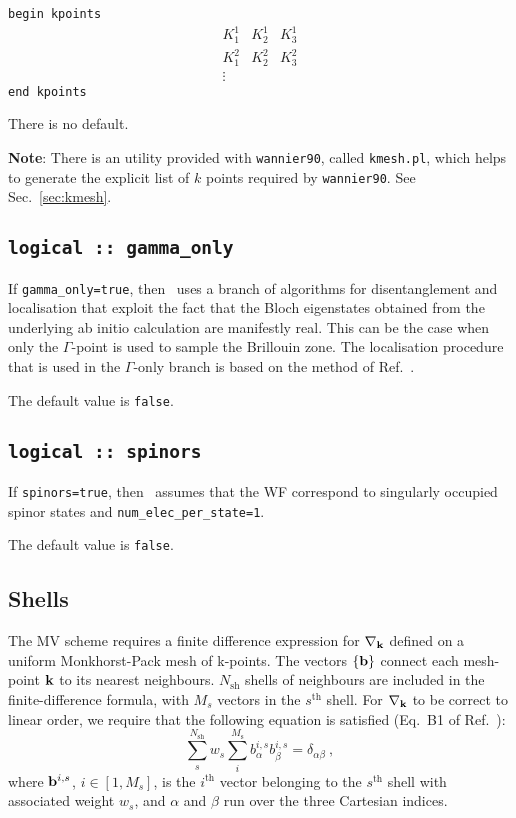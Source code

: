 \noindent \verb#begin kpoints# \\
$$
\begin{array}{ccc}
 K^{1}_{1} & K^{1}_{2} & K^{1}_{3} \\
 K^{2}_{1} & K^{2}_{2} & K^{2}_{3} \\
\vdots
\end{array}
$$
\verb#end kpoints#


There is no default.

{\bfseries Note}: There is an utility provided with {\tt wannier90},
called {\tt kmesh.pl}, which helps to generate the explicit list of
$k$ points required by {\tt wannier90}. See Sec.~\ref{sec:kmesh}.

\subsection[gamma\_only]{{\tt logical :: gamma\_only}}

If {\tt gamma\_only=true}, then \wannier\ uses a branch of algorithms
for disentanglement and localisation that exploit the fact that the 
Bloch eigenstates obtained from the underlying ab initio calculation
are manifestly real. This can be the case when only the $\Gamma$-point
is used to sample the Brillouin zone. The localisation procedure
that is used in the $\Gamma$-only branch is based on the method of
Ref.~\cite{gygi-cpc03}.

The default value is {\tt false}.


\subsection[spinors]{{\tt logical :: spinors}}

If {\tt spinors=true}, then \wannier\ 
assumes that the WF correspond to singularly occupied spinor states and {\tt num\_elec\_per\_state=1}.

The default value is {\tt false}.

\subsection{Shells}

The MV scheme requires a finite difference expression
for $\nabla_{\bf k}$ defined on a uniform Monkhorst-Pack mesh of
k-points. The vectors $\{{\bf b}\}$ connect each mesh-point ${\bf k}$
  to its nearest neighbours. $N_{\mathrm{sh}}$ shells of neighbours
  are included in the finite-difference formula, with $M_s$ vectors in
  the $s^{\mathrm{th}}$ shell. For $\nabla_{{\bf k}}$ to be correct to
  linear order, we require that the following equation is satisfied
  (Eq.~B1 of Ref.~\cite{marzari-prb97}):
\begin{equation}\label{eq:B1}
\sum_{s}^{N_{\mathrm{sh}}} w_s \sum_i^{M_{\mathrm{s}}}
b_{\alpha}^{i,s} b_{\beta}^{i,s} = \delta_{\alpha\beta}\:, 
\end{equation}
where ${\bf b}^{i,s}$, $i\in[1,M_s]$, is the
$i^{\mathrm{th}}$ vector belonging to the $s^{\mathrm{th}}$ shell
with associated weight $w_s$, and $\alpha$ and $\beta$ run over the
three Cartesian indices. 


